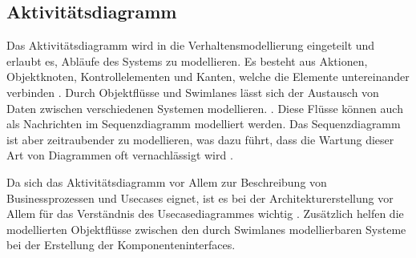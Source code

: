 \subsection{Aktivitätsdiagramm}
Das Aktivitätsdiagramm wird in die Verhaltensmodellierung eingeteilt und erlaubt es, Abläufe des Systems zu modellieren. Es besteht aus Aktionen, Objektknoten, Kontrollelementen und Kanten, welche die Elemente untereinander verbinden \cite[S. 264]{glasklar}. Durch Objektflüsse und Swimlanes lässt sich der Austausch von Daten zwischen verschiedenen Systemen modellieren. \cite[S. 268]{glasklar}. Diese Flüsse können auch als Nachrichten im Sequenzdiagramm modelliert werden. Das Sequenzdiagramm ist aber zeitraubender zu modellieren, was dazu führt, dass die Wartung dieser Art von Diagrammen oft vernachlässigt wird \cite[S. 414]{glasklar}. \cite[S. 263-274]{glasklar}


Da sich das Aktivitätsdiagramm vor Allem zur Beschreibung von Businessprozessen und Usecases eignet, ist es bei der Architekturerstellung vor Allem für das Verständnis des Usecasediagrammes wichtig \cite[S. 271-272]{glasklar}. Zusätzlich helfen die modellierten Objektflüsse zwischen den durch Swimlanes modellierbaren Systeme bei der Erstellung der Komponenteninterfaces.
